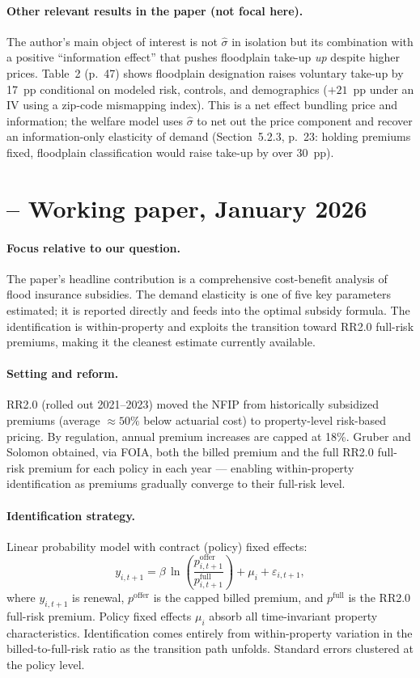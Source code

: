 \documentclass[11pt]{article}
\begin{document}
\paragraph{Other relevant results in the paper (not focal here).}
The author's main object of interest is not $\hat\sigma$ in isolation but
its combination with a positive ``information effect'' that pushes
floodplain take-up \emph{up} despite higher prices. Table~2 (p.~47) shows
floodplain designation raises voluntary take-up by 17~pp conditional on
modeled risk, controls, and demographics ($+21$~pp under an IV using a
zip-code mismapping index). This is a net effect bundling price and
information; the welfare model uses $\hat\sigma$ to net out the price
component and recover an information-only elasticity of demand
(Section~5.2.3, p.~23: holding premiums fixed, floodplain classification
would raise take-up by over 30~pp).

\section{\citet{grubersolomonp2026} -- Working paper, January 2026}

\paragraph{Focus relative to our question.}
The paper's headline contribution is a comprehensive cost-benefit analysis of flood insurance subsidies. The demand elasticity is one of five key parameters estimated; it is reported directly and feeds into the optimal subsidy formula. The identification is within-property and exploits the transition toward RR2.0 full-risk premiums, making it the cleanest estimate currently available.

\paragraph{Setting and reform.}
RR2.0 (rolled out 2021--2023) moved the NFIP from historically subsidized premiums (average $\approx 50\%$ below actuarial cost) to property-level risk-based pricing. By regulation, annual premium increases are capped at 18\%. Gruber and Solomon obtained, via FOIA, both the billed premium and the full RR2.0 full-risk premium for each policy in each year --- enabling within-property identification as premiums gradually converge to their full-risk level.

\paragraph{Identification strategy.}
Linear probability model with contract (policy) fixed effects:
\[
    y_{i,t+1} = \beta\,\ln\!\left(\frac{p_{i,t+1}^{\text{offer}}}{p_{i,t+1}^{\text{full}}}\right) + \mu_i + \varepsilon_{i,t+1},
\]
where $y_{i,t+1}$ is renewal, $p^{\text{offer}}$ is the capped billed premium, and $p^{\text{full}}$ is the RR2.0 full-risk premium. Policy fixed effects $\mu_i$ absorb all time-invariant property characteristics. Identification comes entirely from within-property variation in the billed-to-full-risk ratio as the transition path unfolds. Standard errors clustered at the policy level.
\end{document}
